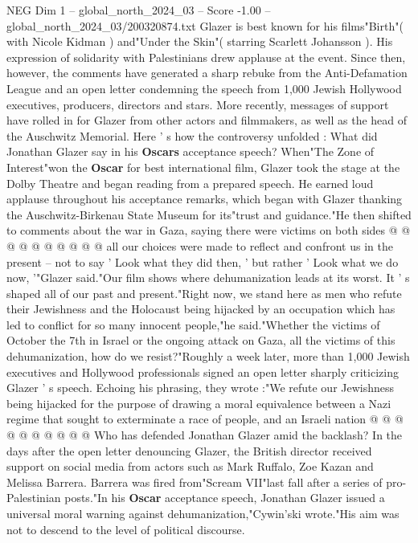 \begin{textsample}{NEG Dim 1 – global\_north\_2024\_03 – Score -1.00 – global\_north\_2024\_03/200320874.txt}  \label{ex:f1_neg_068}
Glazer is best known for his films"Birth"( with Nicole Kidman ) and"Under the Skin"( starring Scarlett Johansson ).
His expression of solidarity with Palestinians drew applause at the event.
Since then, however, the comments have generated a sharp rebuke from the Anti-Defamation League and an open letter condemning the speech from 1,000 Jewish Hollywood executives, producers, directors and stars.
More recently, messages of support have rolled in for Glazer from other actors and filmmakers, as well as the head of the Auschwitz Memorial.
Here ' s how the controversy unfolded : What did Jonathan Glazer say in his \textbf{Oscars} acceptance speech?
When"The Zone of Interest"won the \textbf{Oscar} for best international film, Glazer took the stage at the Dolby Theatre and began reading from a prepared speech.
He earned loud applause throughout his acceptance remarks, which began with Glazer thanking the Auschwitz-Birkenau State Museum for its"trust and guidance."He then shifted to comments about the war in Gaza, saying there were victims on both sides @ @ @ @ @ @ @ @ @ @ all our choices were made to reflect and confront us in the present -- not to say ' Look what they did then, ' but rather ' Look what we do now, '"Glazer said."Our film shows where dehumanization leads at its worst.
It ' s shaped all of our past and present."Right now, we stand here as men who refute their Jewishness and the Holocaust being hijacked by an occupation which has led to conflict for so many innocent people,"he said."Whether the victims of October the 7th in Israel or the ongoing attack on Gaza, all the victims of this dehumanization, how do we resist?"Roughly a week later, more than 1,000 Jewish executives and Hollywood professionals signed an open letter sharply criticizing Glazer ' s speech.
Echoing his phrasing, they wrote :"We refute our Jewishness being hijacked for the purpose of drawing a moral equivalence between a Nazi regime that sought to exterminate a race of people, and an Israeli nation @ @ @ @ @ @ @ @ @ @ Who has defended Jonathan Glazer amid the backlash?
In the days after the open letter denouncing Glazer, the British director received support on social media from actors such as Mark Ruffalo, Zoe Kazan and Melissa Barrera.
Barrera was fired from"Scream VII"last fall after a series of pro-Palestinian posts."In his \textbf{Oscar} acceptance speech, Jonathan Glazer issued a universal moral warning against dehumanization,"Cywin'ski wrote."His aim was not to descend to the level of political discourse.

\end{textsample}

